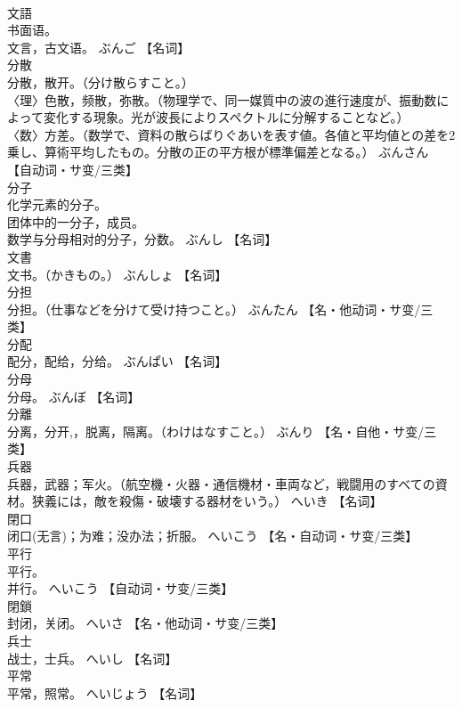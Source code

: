 \documentclass[8pt]{extreport}
\begin{document}
\begin{CJK}{UTF8}{min}
\\	文語	
\\	书面语。 
\\	文言，古文语。	ぶんご		【名词】
\\	分散	
\\	分散，散开。（分け散らすこと。） 
\\	〈理〉色散，频散，弥散。（物理学で、同一媒質中の波の進行速度が、振動数によって変化する現象。光が波長によりスペクトルに分解することなど。） 
\\	〈数〉方差。（数学で、資料の散らばりぐあいを表す値。各値と平均値との差を2乗し、算術平均したもの。分散の正の平方根が標準偏差となる。）	ぶんさん		【自动词・サ变/三类】
\\	分子	
\\	化学元素的分子。 
\\	团体中的一分子，成员。 
\\	数学与分母相对的分子，分数。	ぶんし		【名词】
\\	文書	
\\	文书。（かきもの。）	ぶんしょ		【名词】
\\	分担	
\\	分担。（仕事などを分けて受け持つこと。）	ぶんたん		【名・他动词・サ变/三类】
\\	分配	
\\	配分，配给，分给。	ぶんぱい		【名词】
\\	分母	
\\	分母。	ぶんぼ		【名词】
\\	分離	
\\	分离，分开,，脱离，隔离。（わけはなすこと。）	ぶんり		【名・自他・サ变/三类】
\\	兵器	
\\	兵器，武器；军火。（航空機・火器・通信機材・車両など，戦闘用のすべての資材。狭義には，敵を殺傷・破壊する器材をいう。）	へいき		【名词】
\\	閉口	
\\	闭口(无言)；为难；没办法；折服。	へいこう		【名・自动词・サ变/三类】
\\	平行	
\\	平行。 
\\	并行。	へいこう		【自动词・サ变/三类】
\\	閉鎖	
\\	封闭，关闭。	へいさ		【名・他动词・サ变/三类】
\\	兵士	
\\	战士，士兵。	へいし		【名词】
\\	平常	
\\	平常，照常。	へいじょう		【名词】

\end{CJK}
\end{document}
